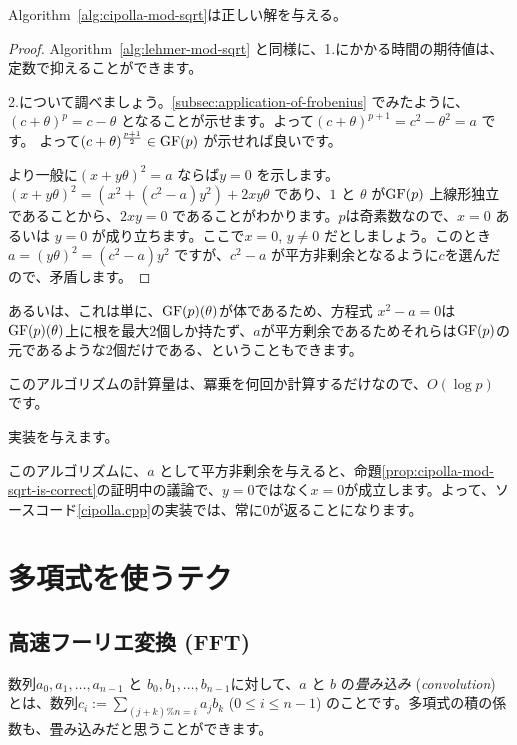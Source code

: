 \documentclass{jsarticle}
\begin{document}
  \begin{proposition}
   \label{prop:cipolla-mod-sqrt-is-correct}
   Algorithm~\ref{alg:cipolla-mod-sqrt}は正しい解を与える。
  \end{proposition}
  \begin{proof}
   Algorithm~\ref{alg:lehmer-mod-sqrt} と同様に、1.にかかる時間の期待値は、定数で抑えることができます。

   2.について調べましょう。\ref{subsec:application-of-frobenius} でみたように、$(c+\theta)^{p} = c - \theta$ となることが示せます。よって$(c+\theta)^{p+1} = c^2-\theta^2 = a$ です。
   よって$(c+\theta)^{\frac{p+1}2} \in \mathrm{GF}(p)$ が示せれば良いです。

   より一般に$(x+y\theta)^2 = a$ ならば$y = 0$ を示します。
   $(x+y\theta)^2 = (x^2+(c^2-a)y^2) + 2xy\theta$ であり、$1$ と $\theta$ が$\mathrm{GF}(p)$ 上線形独立であることから、$2xy = 0$ であることがわかります。$p$は奇素数なので、$x=0$ あるいは $y=0$ が成り立ちます。ここで$x = 0$, $y \neq 0$ だとしましょう。このとき$a = (y\theta)^2 = (c^2-a)y^2$ ですが、$c^2-a$ が平方非剰余となるように$c$を選んだので、矛盾します。
  \end{proof}
  \begin{remark}
   あるいは、これは単に、$\mathrm{GF}(p)(\theta)$が体であるため、方程式 $x^2-a = 0$は$\mathrm{GF}(p)(\theta)$上に根を最大2個しか持たず、$a$が平方剰余であるためそれらは$\mathrm{GF}(p)$の元であるような2個だけである、ということもできます。
  \end{remark}
  このアルゴリズムの計算量は、冪乗を何回か計算するだけなので、$O(\log p)$ です。

  実装を与えます。
  
  \begin{remark}
   このアルゴリズムに、$a$ として平方非剰余を与えると、命題\ref{prop:cipolla-mod-sqrt-is-correct}の証明中の議論で、$y=0$ではなく$x=0$が成立します。よって、ソースコード\ref{cipolla.cpp}の実装では、常に0が返ることになります。
  \end{remark}
 \section{多項式を使うテク~}
 \label{sec:technique-using-polynomials}
  \subsection{高速フーリエ変換 (FFT)~}
  \label{subsec:fft}
  数列$a_0, a_1, \ldots, a_{n-1}$ と $b_0, b_1, \ldots, b_{n-1}$に対して、$a$ と $b$ の\emph{畳み込み} (\emph{convolution}) とは、数列$c_i := \sum_{(j+k)\%n=i} a_{j}b_{k}$ ($0 \le i \le n - 1$) のことです。多項式の積の係数も、畳み込みだと思うことができます。
\end{document}

